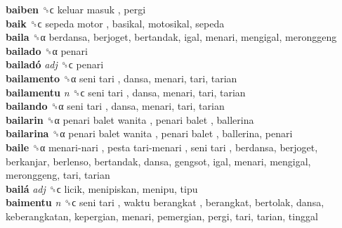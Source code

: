 \textbf{baiben} ␝ϲ   keluar masuk , pergi  \\
\textbf{baik} ␝ϲ   sepeda motor , basikal, motosikal, sepeda  \\
\textbf{baila} ␝α  berdansa, berjoget, bertandak, igal, menari, mengigal, meronggeng  \\
\textbf{bailado} ␝α  penari  \\
\textbf{bailadó} \emph{adj}  ␝ϲ  penari  \\
\textbf{bailamento} ␝α   seni tari , dansa, menari, tari, tarian  \\
\textbf{bailamentu} \emph{n}  ␝ϲ   seni tari , dansa, menari, tari, tarian  \\
\textbf{bailando} ␝α   seni tari , dansa, menari, tari, tarian  \\
\textbf{bailarin} ␝α   penari balet wanita ,  penari balet , ballerina  \\
\textbf{bailarina} ␝α   penari balet wanita ,  penari balet , ballerina, penari  \\
\textbf{baile} ␝α   menari-nari ,  pesta tari-menari ,  seni tari , berdansa, berjoget, berkanjar, berlenso, bertandak, dansa, gengsot, igal, menari, mengigal, meronggeng, tari, tarian  \\
\textbf{bailá} \emph{adj}  ␝ϲ  licik, menipiskan, menipu, tipu  \\
\textbf{baimentu} \emph{n}  ␝ϲ   seni tari ,  waktu berangkat , berangkat, bertolak, dansa, keberangkatan, kepergian, menari, pemergian, pergi, tari, tarian, tinggal  \\
